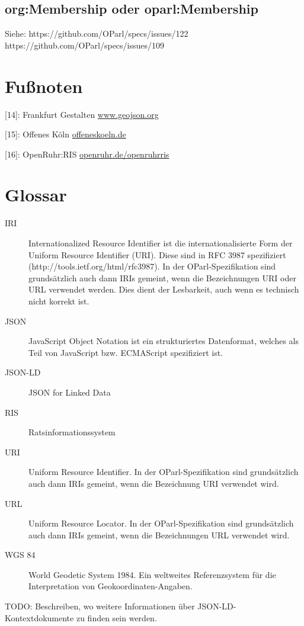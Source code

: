 \documentclass[,a4paper]{article}
\begin{document}
\subsection{org:Membership oder
oparl:Membership}\label{oparlux5fmembership}

Siehe: https://github.com/OParl/specs/issues/122
https://github.com/OParl/specs/issues/109

\section{Fußnoten}\label{fuuxdfnoten}

{[}14{]}: Frankfurt Gestalten
\href{http://www.geojson.org/}{www.geojson.org}

{[}15{]}: Offenes Köln \href{http://offeneskoeln.de/}{offeneskoeln.de}

{[}16{]}: OpenRuhr:RIS
\href{http://openruhr.de/openruhrris/}{openruhr.de/openruhrris}

\section{Glossar}\label{glossar}

\begin{description}
\item[IRI]
Internationalized Resource Identifier ist die internationalisierte Form
der Uniform Resource Identifier (URI). Diese sind in RFC 3987
spezifiziert (http://tools.ietf.org/html/rfc3987). In der
OParl-Spezifikation sind grundsätzlich auch dann IRIs gemeint, wenn die
Bezeichnungen URI oder URL verwendet werden. Dies dient der Lesbarkeit,
auch wenn es technisch nicht korrekt ist.
\item[JSON]
JavaScript Object Notation ist ein strukturiertes Datenformat, welches
als Teil von JavaScript bzw. ECMAScript spezifiziert ist.
\item[JSON-LD]
JSON for Linked Data
\item[RIS]
Ratsinformationssystem
\item[URI]
Uniform Resource Identifier. In der OParl-Spezifikation sind
grundsätzlich auch dann IRIs gemeint, wenn die Bezeichnung URI verwendet
wird.
\item[URL]
Uniform Resource Locator. In der OParl-Spezifikation sind grundsätzlich
auch dann IRIs gemeint, wenn die Bezeichnungen URL verwendet wird.
\item[WGS 84]
World Geodetic System 1984. Ein weltweites Referenzsystem für die
Interpretation von Geokoordinaten-Angaben.
\end{description}


TODO: Beschreiben, wo weitere Informationen über
JSON-LD-Kontextdokumente zu finden sein werden.
\end{document}
